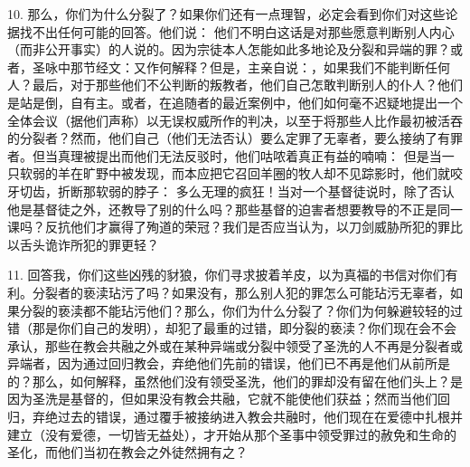 10. 那么，你们为什么分裂了？如果你们还有一点理智，必定会看到你们对这些论据找不出任何可能的回答。他们说： 他们不明白这话是对那些愿意判断别人内心（而非公开事实）的人说的。因为宗徒本人怎能如此多地论及分裂和异端的罪？或者，圣咏中那节经文：又作何解释？但是，主亲自说：，如果我们不能判断任何人？最后，对于那些他们不公判断的叛教者，他们自己怎敢判断别人的仆人？他们是站是倒，自有主。或者，在追随者的最近案例中，他们如何毫不迟疑地提出一个全体会议（据他们声称）以无误权威所作的判决，以至于将那些人比作最初被活吞的分裂者？然而，他们自己（他们无法否认）要么定罪了无辜者，要么接纳了有罪者。但当真理被提出而他们无法反驳时，他们咕哝着真正有益的喃喃： 但是当一只软弱的羊在旷野中被发现，而本应把它召回羊圈的牧人却不见踪影时，他们就咬牙切齿，折断那软弱的脖子： 多么无理的疯狂！当对一个基督徒说时，除了否认他是基督徒之外，还教导了别的什么吗？那些基督的迫害者想要教导的不正是同一课吗？反抗他们才赢得了殉道的荣冠？我们是否应当认为，以刀剑威胁所犯的罪比以舌头诡诈所犯的罪更轻？\par

11. 回答我，你们这些凶残的豺狼，你们寻求披着羊皮，以为真福的书信对你们有利。分裂者的亵渎玷污了吗？如果没有，那么别人犯的罪怎么可能玷污无辜者，如果分裂的亵渎都不能玷污他们？那么，你们为什么分裂了？你们为何躲避较轻的过错（那是你们自己的发明），却犯了最重的过错，即分裂的亵渎？你们现在会不会承认，那些在教会共融之外或在某种异端或分裂中领受了圣洗的人不再是分裂者或异端者，因为通过回归教会，弃绝他们先前的错误，他们已不再是他们从前所是的？那么，如何解释，虽然他们没有领受圣洗，他们的罪却没有留在他们头上？是因为圣洗是基督的，但如果没有教会共融，它就不能使他们获益；然而当他们回归，弃绝过去的错误，通过覆手被接纳进入教会共融时，他们现在在爱德中扎根并建立（没有爱德，一切皆无益处），才开始从那个圣事中领受罪过的赦免和生命的圣化，而他们当初在教会之外徒然拥有之？\par

